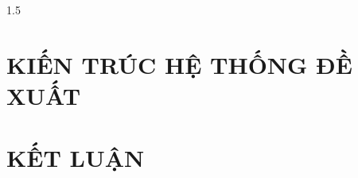 \documentclass[10pt, a4paper]{report}
\begin{document}
\begin{spacing}{1.5}
\begin{justify}
\chapter{KIẾN TRÚC HỆ THỐNG ĐỀ XUẤT}


\chapter{KẾT LUẬN}




\end{justify}
\end{spacing}

\printbibliography
\end{document}
